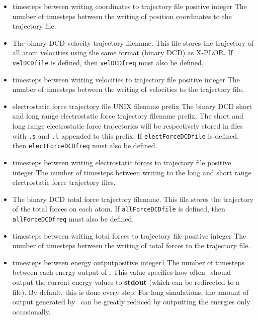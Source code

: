 \begin{itemize}
\item
{}%
{timesteps between writing coordinates to trajectory file}%
{positive integer}%
{%
The number of timesteps between the writing of position coordinates 
to the trajectory file.  
}

\item
{}
{
The binary DCD velocity trajectory filename.  
This file stores the trajectory of 
all atom velocities using the same format (binary DCD) as X-PLOR.  
If \verb!velDCDfile! is defined, then \verb!velDCDfreq! must also 
be defined.  
}

\item
{}%
{timesteps between writing velocities to trajectory file}%
{positive integer}%
{%
The number of timesteps between the writing of 
velocities to the trajectory file.  
}

\item
{}%
{electrostatic force trajectory file}%
{UNIX filename prefix}%
{%
The binary DCD short and long range electrostatic force 
trajectory filename prefix.  
The short and long range electrostatic force trajectories 
will be respectively stored in files with 
\verb!.s! and \verb!.l! appended to this prefix.  
If \verb!electForceDCDfile! is defined, then \verb!electForceDCDfreq! 
must also be defined.  
}

\item
{}%
{timesteps between writing electrostatic forces to trajectory file}%
{positive integer}%
{%
The number of timesteps between writing 
to the long and short range electrostatic force trajectory files.  
}

\item
{}
{%
The binary DCD total force trajectory filename.  
This file stores the trajectory of the total forces 
on each atom.  
If \verb!allForceDCDfile! is defined, then 
\verb!allForceDCDfreq! must also be defined.  
}

\item
{}%
{timesteps between writing total forces to trajectory file}%
{positive integer}%
{%
The number of timesteps between the writing of total forces 
to the trajectory file.  
}

\item
{}%
{timesteps between energy output}{positive integer}{1}%
{%
The number of timesteps between each energy output of \NAMD.  
This value
specifies how often \NAMD\ should output the current energy 
values to {\bf stdout} (which can be redirected to a file).  
By default, this is done every step.  
For long simulations, 
the amount of output generated by \NAMD\ can be greatly reduced 
by outputting the energies only occasionally.  
}

\end{itemize}


